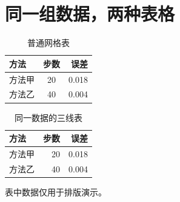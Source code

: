 \documentclass[UTF8,11pt,a4paper,linespread=1]{ctexart}
\begin{document}
\section*{同一组数据，两种表格}
\begin{table}[htbp]
  \centering
  \caption{普通网格表}
  \begin{tabular}{|l|c|r|}
    \hline
    方法 & 步数 & 误差 \\
    \hline
    方法甲 & 20 & 0.018 \\
    方法乙 & 40 & 0.004 \\
    \hline
  \end{tabular}
\end{table}

\begin{table}[htbp]
  \centering
  \caption{同一数据的三线表}
  \begin{tabular}{lrr}
    \toprule
    方法 & 步数 & 误差 \\
    \midrule
    方法甲 & 20 & 0.018 \\
    方法乙 & 40 & 0.004 \\
    \bottomrule
  \end{tabular}
\end{table}
表中数据仅用于排版演示。
\end{document}
